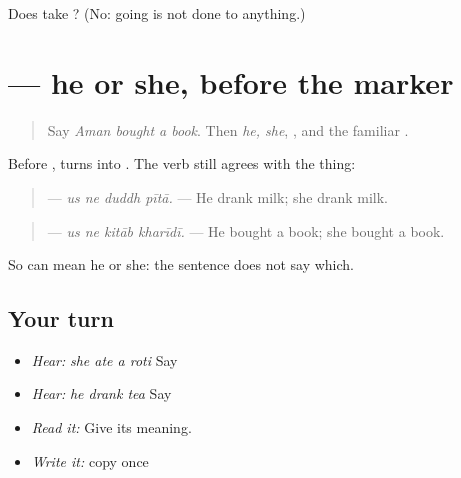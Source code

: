 \begin{tcolorbox}[breakable,colback=teal!4,colframe=teal!35!black,title={Before you move on}]
Does \textbf{  } take \textbf{}? (No: going is not done to anything.)
\end{tcolorbox}
\section[\texorpdfstring{\pa{ਉਸ} \pa{ਨੇ} (us ne)}{ਉਸ ਨੇ (us ne)}]{  — he or she, before the marker}

\label{lesson:PA-C220-us-ne}



\begin{quote}
Say \emph{Aman bought a book}. Then \emph{he, she}, \textbf{}, and the familiar \textbf{}.
\end{quote}

\begin{grammarlens}[title={Grammar Lens: \pa{ਉਹ} turns into \pa{ਉਸ}}]
Before \textbf{}, \textbf{} turns into \textbf{}. The verb still agrees with the thing:

\begin{quote}
\textbf{   } — \emph{us ne duddh pītā.} — He drank milk; she drank milk.
\end{quote}

\begin{quote}
\textbf{   } — \emph{us ne kitāb kharīdī.} — He bought a book; she bought a book.
\end{quote}

So \textbf{ } can mean he or she: the sentence does not say which.
\end{grammarlens}

\subsection*{Your turn}
\begin{itemize}
\raggedright
  \item \emph{Hear:} \emph{she ate a roti} Say \textbf{   }
  \item \emph{Hear:} \emph{he drank tea} Say \textbf{   }
  \item \emph{Read it:} \textbf{   } Give its meaning.
  \item \emph{Write it:} copy \textbf{ } once
\end{itemize}

